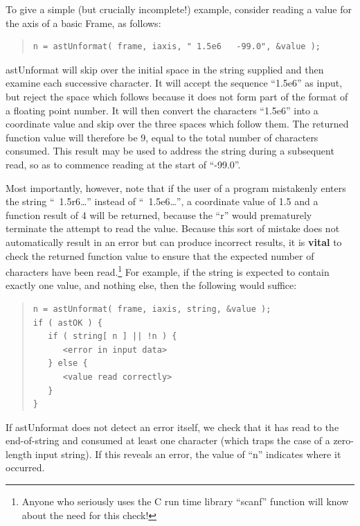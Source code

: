 \documentclass[twoside,11pt]{article}
\begin{document}
To give a simple (but crucially incomplete!) example, consider reading
a value for the axis of a basic Frame, as follows:

\begin{quote}
\small
\begin{verbatim}
n = astUnformat( frame, iaxis, " 1.5e6   -99.0", &value );
\end{verbatim}
\normalsize
\end{quote}

astUnformat will skip over the initial space in the string supplied
and then examine each successive character. It will accept the
sequence ``1.5e6'' as input, but reject the space which follows
because it does not form part of the format of a floating point
number. It will then convert the characters ``1.5e6'' into a
coordinate value and skip over the three spaces which follow them. The
returned function value will therefore be 9, equal to the total number
of characters consumed. This result may be used to address the string
during a subsequent read, so as to commence reading at the start of
``-99.0''.

Most importantly, however, note that if the user of a program
mistakenly enters the string ``~1.5r6\ldots'' instead of
``~1.5e6\ldots'', a coordinate value of 1.5 and a function result of 4
will be returned, because the ``r'' would prematurely terminate the
attempt to read the value. Because this sort of mistake does not
automatically result in an error but can produce incorrect results, it
is {\bf{vital}} to check the returned function value to ensure that
the expected number of characters have been read.\footnote{Anyone who
seriously uses the C run time library ``scanf'' function will know
about the need for this check!}  For example, if the string is
expected to contain exactly one value, and nothing else, then the
following would suffice:

\begin{quote}
\small
\begin{verbatim}
n = astUnformat( frame, iaxis, string, &value );
if ( astOK ) {
   if ( string[ n ] || !n ) {
      <error in input data>
   } else {
      <value read correctly>
   }
}
\end{verbatim}
\normalsize
\end{quote}

If astUnformat does not detect an error itself, we check that it has
read to the end-of-string and consumed at least one character (which
traps the case of a zero-length input string). If this reveals an
error, the value of ``n'' indicates where it occurred.
\end{document}
